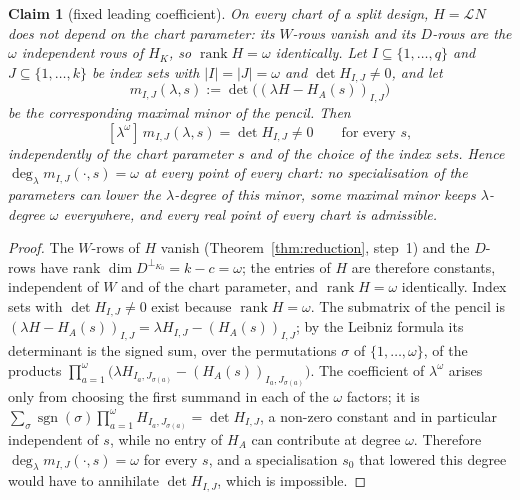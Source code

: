 \documentclass[journal]{IEEEtran}
\theoremstyle{plainn}
\newtheorem{claim}[thm]{Claim}
\theoremstyle{remark}
\newcommand{\rank}{\operatorname{rank}}
\begin{document}
\begin{claim}[fixed leading coefficient]\label{clm:admissible}
On every chart of a split design, $H=\mathcal L N$ does not depend on the chart parameter: its $W$-rows
vanish and its $D$-rows are the $\omega$ independent rows of $H_K$, so $\rank H=\omega$ identically.
Let $I\subseteq\{1,\dots,q\}$ and $J\subseteq\{1,\dots,k\}$ be index sets with $|I|=|J|=\omega$ and
$\det H_{I,J}\neq0$, and let
\[
m_{I,J}(\lambda,s):=\det\bigl((\lambda H-H_A(s))_{I,J}\bigr)
\]
be the corresponding maximal minor of the pencil. Then
\begin{equation}\label{eq:leadcoef}
[\lambda^{\omega}]\,m_{I,J}(\lambda,s)=\det H_{I,J}\neq0
\qquad\text{for every }s,
\end{equation}
independently of the chart parameter $s$ and of the choice of the index sets. Hence
$\deg_\lambda m_{I,J}(\cdot,s)=\omega$ at every point of
every chart: no specialisation of the parameters can lower the $\lambda$-degree of this minor, some maximal
minor keeps $\lambda$-degree $\omega$ everywhere, and every real point of every chart is admissible.
\end{claim}

\begin{proof}
The $W$-rows of $H$ vanish (Theorem~\ref{thm:reduction}, step~1) and the $D$-rows have rank
$\dim D^{\perp_{K_0}}=k-c=\omega$; the entries of $H$ are therefore constants, independent of $W$ and of the
chart parameter, and $\rank H=\omega$ identically. Index sets with $\det H_{I,J}\neq0$ exist because
$\rank H=\omega$. The submatrix of the pencil is $(\lambda H-H_A(s))_{I,J}=\lambda H_{I,J}-(H_A(s))_{I,J}$; by the Leibniz
formula its determinant is the signed sum, over the permutations $\sigma$ of $\{1,\dots,\omega\}$, of the
products $\prod_{a=1}^{\omega}\bigl(\lambda H_{I_a,J_{\sigma(a)}}-(H_A(s))_{I_a,J_{\sigma(a)}}\bigr)$. The
coefficient of $\lambda^{\omega}$ arises only from choosing the first summand in each of the $\omega$
factors; it is
$\sum_{\sigma}\operatorname{sgn}(\sigma)\prod_{a=1}^{\omega}H_{I_a,J_{\sigma(a)}}=\det H_{I,J}$, a non-zero
constant and in particular independent of $s$, while no entry of $H_A$ can contribute at degree $\omega$.
Therefore
$\deg_\lambda m_{I,J}(\cdot,s)=\omega$ for every $s$, and a specialisation $s_0$ that lowered this degree
would have to annihilate $\det H_{I,J}$, which is impossible.
\end{proof}
\end{document}
